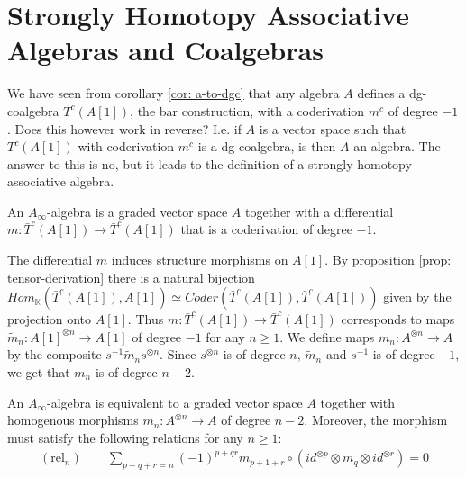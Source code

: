 \documentclass[../thesis.tex]{subfiles}
\begin{document}
    \section{Strongly Homotopy Associative Algebras and Coalgebras}
        We have seen from corollary \ref{cor: a-to-dgc} that any algebra $A$ defines a dg-coalgebra $T^c(A[1])$, the bar construction, with a coderivation $m^c$ of degree $-1$. Does this however work in reverse? I.e. if $A$ is a vector space such that $T^c(A[1])$ with coderivation $m^c$ is a dg-coalgebra, is then $A$ an algebra. The answer to this is no, but it leads to the definition of a strongly homotopy associative algebra.

        \begin{definition}
            An $A_\infty$-algebra is a graded vector space $A$ together with a differential $m:\bar{T}^c(A[1])\rightarrow\bar{T}^c(A[1])$ that is a coderivation of degree $-1$.
        \end{definition}

        The differential $m$ induces structure morphisms on $A[1]$. By proposition \ref{prop: tensor-derivation} there is a natural bijection $Hom_\mathbb{K}(\bar{T}^c(A[1]),A[1])\simeq Coder(\bar{T}^c(A[1]),\bar{T}^c(A[1]))$ given by the projection onto $A[1]$. Thus $m:\bar{T}^c(A[1])\rightarrow\bar{T}^c(A[1])$ corresponds to maps $\widetilde{m}_n:A[1]^{\otimes n}\rightarrow A[1]$ of degree $-1$ for any $n\geq 1$. We define maps $m_n : A^{\otimes n}\rightarrow A$ by the composite $s^{-1}\widetilde{m}_ns^{\otimes n}$. Since $s^{\otimes n}$ is of degree $n$, $\widetilde{m}_n$ and $s^{-1}$ is of degree $-1$, we get that $m_n$ is of degree $n-2$.
        \begin{center}
        \end{center}

        \begin{proposition}\label{prop: A-infinity def}
            An $A_\infty$-algebra is equivalent to a graded vector space $A$ together with homogenous morphisms $m_n:A^{\otimes n}\rightarrow A$ of degree $n-2$. Moreover, the morphism must satisfy the following relations for any $n\geq 1$:
            \begin{align*}
                (\text{rel}_n)\qquad \sum_{p+q+r = n}(-1)^{p+qr}m_{p+1+r}\circ (id^{\otimes p}\otimes m_q \otimes id^{\otimes r}) = 0
            \end{align*}
        \end{proposition}
\end{document}

